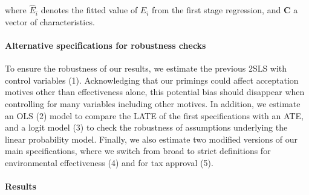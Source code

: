 \documentclass[12pt]{article} %
\begin{document}
\noindent
where $\widehat{E}_i$ denotes the fitted value of $E_i$ from the first stage regression, and $\textbf{C}$ a vector of characteristics.

\paragraph{Alternative specifications for robustness checks}

To ensure the robustness of our results, we estimate the previous 2SLS with control variables (1). Acknowledging that our primings could affect acceptation motives other than effectiveness alone, this potential bias should disappear when controlling for many variables including other motives. In addition, we estimate an OLS (2) model to compare the LATE of the first specifications with an ATE, and a logit model (3) to check the robustness of assumptions underlying the linear probability model. Finally, we also estimate two modified versions of our main specifications, where we switch from broad to strict definitions for environmental effectiveness (4) and for tax approval (5).


\paragraph{Results}
\end{document}
